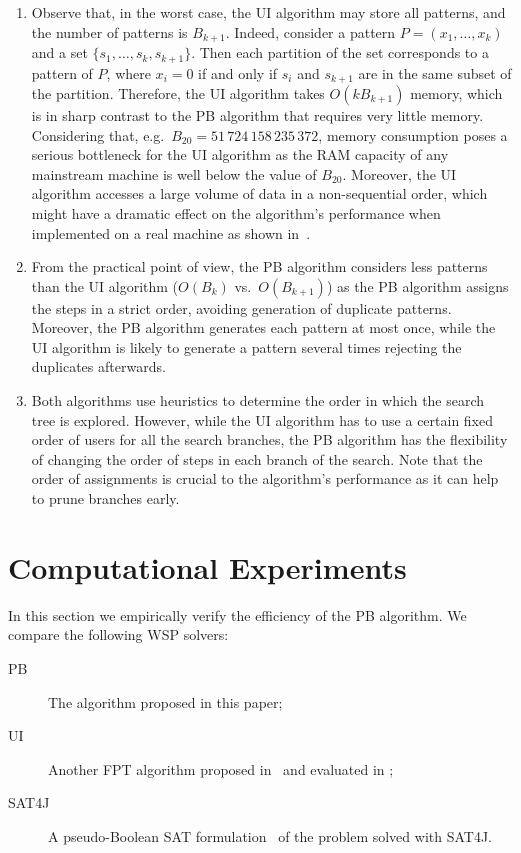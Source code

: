 \documentclass[runningheads,proof]{llncs}
\begin{document}
\begin{enumerate}
	\item Observe that, in the worst case, the UI algorithm may store all patterns, and the number of patterns is $B_{k+1}$. Indeed, consider a pattern $P=(x_1,\dots ,x_k)$ and a set $\{s_1,\dots ,s_k,s_{k+1}\}.$ Then each partition of the set corresponds to a pattern of $P$, where $x_i=0$ if and only if $s_i$ and $s_{k+1}$ are in the same subset of the partition.
	Therefore,  the UI algorithm takes $O(k B_{k+1})$ memory, which is in sharp contrast to the PB algorithm that requires very little memory.
	Considering that, e.g.\ $B_{20} = 51\,724\,158\,235\,372$, memory consumption poses a serious bottleneck for the UI algorithm as the RAM capacity of any mainstream machine is well below the 
	value of $B_{20}$.
	Moreover, the UI algorithm accesses a large volume of data in a non-sequential order, which might have a dramatic effect on the algorithm's performance when implemented on a real machine as shown in~\cite{KaGuGo}.


	\item From the practical point of view, the PB algorithm considers less
patterns than the UI algorithm ($O(B_k)$ vs.\ $O(B_{k+1})$) as
the PB algorithm assigns the steps in a strict order, avoiding generation of duplicate patterns.  Moreover, the
PB algorithm generates each pattern at most once, while the UI
algorithm is likely to generate a pattern several times rejecting the duplicates afterwards.  


	\item Both algorithms use heuristics to determine the order in which the search tree is explored.
	However, while the UI algorithm has to use a certain fixed order of users for all the search branches, the PB algorithm has the flexibility of changing the order of steps in each branch of the search.
	Note that the order of assignments is crucial to the algorithm's performance as it can help to prune branches early.
\end{enumerate}




\section{Computational Experiments}
\label{sec:experiments}

In this section we empirically verify the efficiency of the PB algorithm.  We compare the following WSP solvers:
\begin{description}
	\item[PB] The algorithm proposed in this paper;
	\item[UI] Another FPT algorithm proposed in~\cite{CoCrGaGuJo13} and evaluated in \cite{FAW2014,JOCO2014};
	\item[SAT4J] A pseudo-Boolean SAT formulation~\cite{FAW2014,JOCO2014} of the problem solved with SAT4J.
\end{description}
\end{document}
